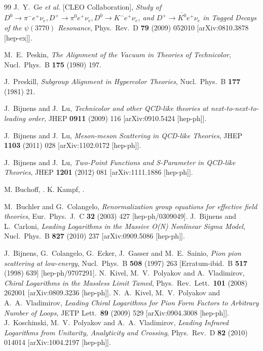 \documentclass[cits,hyper]{PoS}
\begin{document}
\begin{thebibliography}{99}
  J.~Y.~Ge {\it et al.}  [CLEO Collaboration],
  \emph{Study of $D^0\to\pi^-e^+ \nu_e, D^+ \to\pi^0 e^+ \nu_e, D^0 \to K^- e^+ \nu_e$, and
  $D^+\to\overline{K^0} e^+ \nu_e$ in Tagged Decays of the $\psi(3770)$ Resonance},
  Phys.\ Rev.\  D {\bf 79} (2009) 052010
  [arXiv:0810.3878 [hep-ex]].

  M.~E.~Peskin,
  \emph{The Alignment of the Vacuum in Theories of Technicolor},
  Nucl.\ Phys.\ B {\bf 175} (1980) 197.

  J.~Preskill,
  \emph{Subgroup Alignment in Hypercolor Theories},
  Nucl.\ Phys.\ B {\bf 177} (1981) 21.

  J.~Bijnens and J.~Lu,
  \emph{Technicolor and other QCD-like theories at next-to-next-to-leading order},
  JHEP {\bf 0911} (2009) 116
  [arXiv:0910.5424 [hep-ph]].

  J.~Bijnens and J.~Lu,
  \emph{Meson-meson Scattering in QCD-like Theories},
  JHEP {\bf 1103} (2011) 028
  [arXiv:1102.0172 [hep-ph]].

  J.~Bijnens and J.~Lu,
  \emph{Two-Point Functions and S-Parameter in QCD-like Theories},
  JHEP {\bf 1201} (2012) 081
  [arXiv:1111.1886 [hep-ph]].

M. Buchoff, .
K. Kampf, .

 M.~Buchler and G.~Colangelo,
  \emph{Renormalization group equations for effective field theories},
  Eur.\ Phys.\ J.\ C {\bf 32} (2003) 427
  [hep-ph/0309049].
 J.~Bijnens and L.~Carloni,
  \emph{Leading Logarithms in the Massive O(N) Nonlinear Sigma Model},
  Nucl.\ Phys.\ B {\bf 827} (2010) 237
  [arXiv:0909.5086 [hep-ph]].

  J.~Bijnens, G.~Colangelo, G.~Ecker, J.~Gasser and M.~E.~Sainio,
  \emph{Pion pion scattering at low-energy},
  Nucl.\ Phys.\ B {\bf 508} (1997) 263
   [Erratum-ibid.\ B {\bf 517} (1998) 639]
  [hep-ph/9707291].
  N.~Kivel, M.~V.~Polyakov and A.~Vladimirov,
  \emph{Chiral Logarithms in the Massless Limit Tamed},
  Phys.\ Rev.\ Lett.\  {\bf 101} (2008) 262001
  [arXiv:0809.3236 [hep-ph]].
  N.~A.~Kivel, M.~V.~Polyakov and A.~A.~Vladimirov,
  \emph{Leading Chiral Logarithms for Pion Form Factors to Arbitrary Number of Loops},
  JETP Lett.\  {\bf 89} (2009) 529
  [arXiv:0904.3008 [hep-ph]].
  J.~Koschinski, M.~V.~Polyakov and A.~A.~Vladimirov,
  \emph{Leading Infrared Logarithms from Unitarity, Analyticity and Crossing},
  Phys.\ Rev.\ D {\bf 82} (2010) 014014
  [arXiv:1004.2197 [hep-ph]].


\end{thebibliography}
\end{document}

